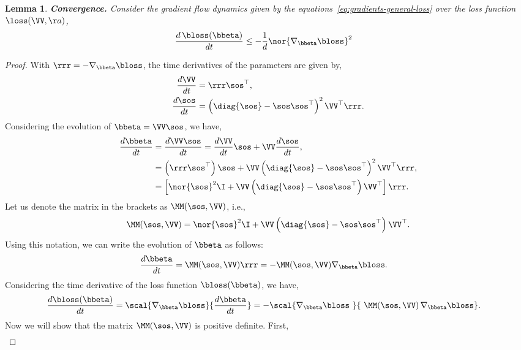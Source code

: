 \documentclass{article}
\theoremstyle{plain}
\newtheorem{lemma}[theorem]{Lemma}
\theoremstyle{definition}
\theoremstyle{remark}
\begin{document}
\begin{lemma}\label{lem:convergence-general-loss}\textbf{Convergence.}
Consider the gradient flow dynamics given by the equations~\eqref{eq:gradients-general-loss} over the loss function $\loss(\VV, \aa)$, 
\begin{align*}
    \frac{d \, \bloss(\bbeta)}{dt} &\leq - \frac{1}{d} \nor{\nabla_{\bbeta} \bloss}^2 
\end{align*} 
\end{lemma}
\begin{proof}
    With $\rrr = - \nabla_{\bbeta} \bloss $, the time derivatives of the parameters are given by, 
    \begin{align*}
        \frac{d\VV}{dt} &=  \rrr \sos^{\top},  \\
        \frac{d\sos}{dt} &=  \left( \diag{\sos} - \sos \sos^{\top} \right)^2 \VV^{\top} \rrr.
    \end{align*}
    Considering the evolution of $\bbeta = \VV \sos$, we have,
    \begin{align*}
        \frac{d \bbeta}{dt} &= \frac{d \VV \sos}{dt} = \frac{d\VV}{dt} \sos + \VV \frac{d\sos}{dt}, \\
        &= \left( \rrr \sos^{\top} \right) \sos + \VV \left( \diag{\sos} - \sos \sos^{\top} \right)^2 \VV^{\top} \rrr, \\
        &= \left[ \nor{\sos}^2 \I +  \VV \left( \diag{\sos} - \sos \sos^{\top} \right) \VV^{\top} \right] \rrr. 
    \end{align*}
    Let us denote the matrix in the brackets as $\MM(\sos, \VV)$, i.e., 
    \begin{align*}
        \MM(\sos, \VV) = \nor{\sos}^2 \I +  \VV \left( \diag{\sos} - \sos \sos^{\top} \right) \VV^{\top}.
    \end{align*}    
    Using this notation, we can write the evolution of $\bbeta$ as follows:
    \begin{align*}
        \frac{d \bbeta}{dt} &=  \MM(\sos, \VV) \rrr = - \MM(\sos, \VV) \nabla_{\bbeta} \bloss. 
    \end{align*}
    Considering the time derivative of the loss function $\bloss(\bbeta)$, we have,
    \begin{align*}
        \frac{d \bloss(\bbeta)}{dt} &= \scal{\nabla_{\bbeta} \bloss}{\frac{d \bbeta}{dt}} = - \scal{\nabla_{\bbeta} \bloss \, \, }{\, \, \MM(\sos, \VV) \, \nabla_{\bbeta} \bloss}. 
    \end{align*}
    Now we will show that the matrix $\MM(\sos, \VV)$ is positive definite. First, 
    \begin{align*}

\end{align*}
\end{proof}
\end{document}
